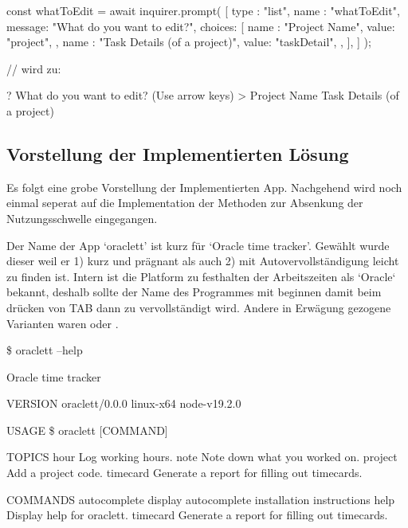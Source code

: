 \documentclass[oneside,bibliography=totocnumbered,BCOR=5mm]{scrbook}
\newenvironment{code}{\captionsetup{type=listing, skip=0pt}}{}
\begin{document}
\begin{code}
  \medskip
  \begin{javascriptcode}
const { whatToEdit } = await inquirer.prompt( [ {
  type   : "list",
  name   : "whatToEdit",
  message: "What do you want to edit?",
  choices: [
    {
      name : "Project Name",
      value: "project",
    },
    {
      name : "Task Details (of a project)",
      value: "taskDetail",
    },
  ],
} ] );

// wird zu:

? What do you want to edit? (Use arrow keys)
> Project Name
  Task Details (of a project)
  \end{javascriptcode}
\end{code}

\subsection{Vorstellung der Implementierten Lösung}


Es folgt eine grobe Vorstellung der Implementierten App. Nachgehend wird
noch einmal seperat auf die Implementation der Methoden zur Absenkung der
Nutzungsschwelle eingegangen.

\medskip

Der Name der App `oraclett' ist kurz für `Oracle time tracker'. Gewählt wurde
dieser weil er 1) kurz und prägnant als auch 2) mit Autovervollständigung leicht
zu finden ist. Intern ist die Platform zu festhalten der Arbeitszeiten als
`Oracle` bekannt, deshalb sollte der Name des Programmes mit 
beginnen damit beim drücken von TAB dann zu 
vervollständigt wird. Andere in Erwägung gezogene Varianten waren
 oder .

\begin{code}
  \medskip
  \label{code:oraclett-help}
  \begin{shellcode}
  \$ oraclett --help

  Oracle time tracker

  VERSION
    oraclett/0.0.0 linux-x64 node-v19.2.0

  USAGE
    \$ oraclett [COMMAND]

  TOPICS
    hour      Log working hours.
    note      Note down what you worked on.
    project   Add a project code.
    timecard  Generate a report for filling out timecards.

  COMMANDS
    autocomplete  display autocomplete installation instructions
    help          Display help for oraclett.
    timecard      Generate a report for filling out timecards.
  \end{shellcode}
\end{code}
\end{document}
